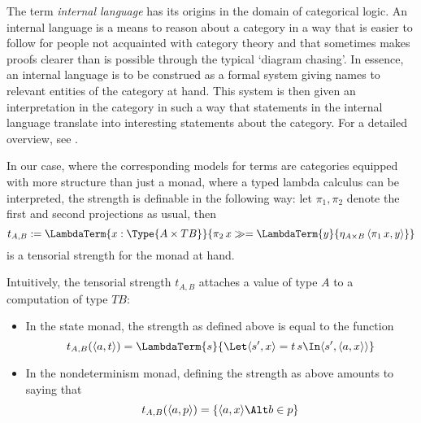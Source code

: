 \begin{rem}
  The term \emph{internal language} has its origins in the domain of categorical
  logic. An internal language is a means to reason about a category in a way
  that is easier to follow for people not acquainted with category theory and
  that sometimes makes proofs clearer than is possible through the typical
  `diagram chasing'. In essence, an internal language is to be construed as a
  formal system giving names to relevant entities of the category at hand. This
  system is then given an interpretation in the category in such a way that
  statements in the internal language translate into interesting statements
  about the category. For a detailed overview, see \cite{Pitts95}.
\end{rem}



In our case, where the corresponding models for terms are
categories equipped with more structure than just a monad, \IE where a typed
lambda calculus can be interpreted, the strength is
definable in the following way: let $\pi_1, \pi_2$ denote the first and second
projections as usual, then
\[
t_{A,B} := \LambdaTerm{x:\Type{A\times T B}}{\pi_2\,x \gg= \LambdaTerm{y}{\eta_{A\times B}\, \langle\pi_1\,x, y\rangle}}
\]
is a tensorial strength for the monad at hand. 
\begin{expl}
  Intuitively, the tensorial strength $t_{A,B}$ attaches a value of type $A$ to
  a computation of type $T B$:
  \begin{itemize}
  \item In the state monad, the strength as defined above is equal to the
    function \[
    t_{A,B}(\langle a, t\rangle) = \LambdaTerm{s}{\Let \langle s', x\rangle = t\,s
      \In \langle s', \langle a, x\rangle\rangle} \]
  \item In the nondeterminism monad, defining the strength as above amounts to
    saying that
    \[
    t_{A,B}(\langle a, p\rangle) = \{\langle a, x\rangle \Alt b\in p\}
    \]
  \end{itemize}
\end{expl}



